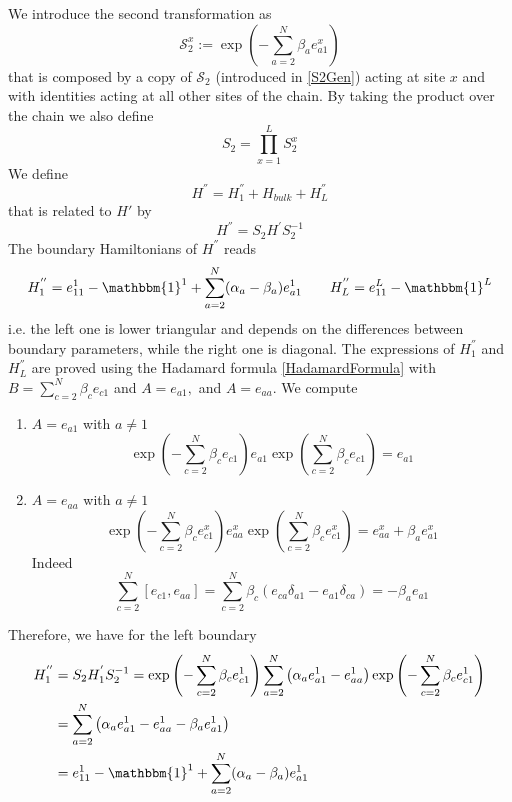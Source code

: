 \documentclass[11pt]{article}
\numberwithin{equation}{section}
\numberwithin{equation}{subsection}
\begin{document}
We introduce the second transformation as 
 \begin{equation}
 	\mathcal{S}_{2}^{x}:=\exp{\left(-\sum_{a=2}^{N}\beta_{a}e_{a1}^{x}\right)}%
 \end{equation}
that is composed by a copy of $\mathcal{S}_{2}$ (introduced in \eqref{S2Gen}) acting at site $x$ and with identities acting at all other sites of the chain. 
By taking the product over the chain we also define
\begin{equation}
	S_{2}=\prod_{x=1}^{L}S_{2}^{x}
\end{equation}
We define 
\begin{equation}
	H^{''}=H_{1}^{''}+H_{bulk}+H_{L}^{''}
\end{equation}
that is related to $H'$ by
\begin{equation}
	H^{''}=S_{2}H^{'}S_{2}^{-1}
\end{equation}
The boundary Hamiltonians of $H^{''}$ reads
\begin{align}
	H_{1}^{''}=e_{11}^{1}-\mathbbm{1}^{1}+\sum_{a=2}^{N}(\alpha_{a}-\beta_{a})e_{a1}^{1}\qquad H_{L}^{''}=e_{11}^{L}-\mathbbm{1}^{L}
\end{align}
i.e. the left one is lower triangular and depends on the differences between boundary parameters, while the right one is diagonal. The expressions of $H_{1}^{''}$ and $H_{L}^{''}$ are proved using the Hadamard formula \eqref{HadamardFormula} with $B=\sum_{c=2}^{N}\beta_{c}e_{c1}$ and $A=e_{a1},$ and $A=e_{aa}$. We compute
\begin{enumerate}
	\item $A=e_{a1}$ with $a\neq 1$
	\begin{equation}
		\exp{\left(-\sum_{c=2}^{N}\beta_{c}e_{c1}\right)}e_{a1}\exp{\left(\sum_{c=2}^{N}\beta_{c}e_{c1}\right)}=e_{a1}
	\end{equation}
\item $A=e_{aa}$ with $a\neq 1$
\begin{equation}
		\exp{\left(-\sum_{c=2}^{N}\beta_{c}e_{c1}^{x}\right)}e_{aa}^{x}\exp{\left(\sum_{c=2}^{N}\beta_{c}e_{c1}^{x}\right)}=e_{aa}^{x}+\beta_{a}e_{a1}^{x}
	\end{equation}
Indeed 
\begin{equation}
	\sum_{c=2}^{N}[e_{c1},e_{aa}]=\sum_{c=2}^{N}\beta_{c}\left(e_{ca}\delta_{a1}-e_{a1}\delta_{ca}\right)=-\beta_{a}e_{a1}
\end{equation}
\end{enumerate}
Therefore, we have for the left boundary
\begin{equation}
	\begin{split}
		H_{1}^{''}&=S_{2}H_{1}^{'}S_{2}^{-1}=\exp{\left(-\sum_{c=2}^{N}\beta_{c}e_{c1}^{1}\right)}\sum_{a=2}^{N}\left(\alpha_{a}e_{a1}^{1}-e_{aa}^{1}\right)\exp{\left(-\sum_{c=2}^{N}\beta_{c}e_{c1}^{1}\right)}
		\\&=
		\sum_{a=2}^{N}\left(\alpha_{a}e_{a1}^{1}-e_{aa}^{1}-\beta_{a}e_{a1}^{1}\right)
		\\&=
		e_{11}^{1}-\mathbbm{1}^{1}+\sum_{a=2}^{N}(\alpha_{a}-\beta_{a})e_{a1}^{1}
	\end{split}
\end{equation}
\end{document}
